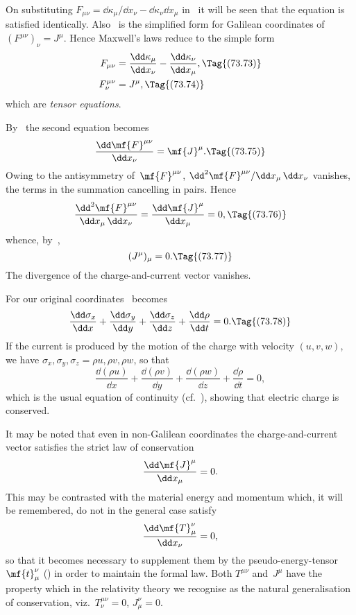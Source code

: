\documentclass[12pt]{book}
\begin{document}
On substituting $F_{\mu\nu} = \dd\kappa_{\mu}/\dd x_{\nu} - \dd\kappa_{\nu}\dd x_{\mu}$ in~ it will be seen that the
equation is satisfied identically. Also ~is the simplified form for Galilean
coordinates of $(F^{\mu\nu})_{\nu} = J^{\mu}$. Hence Maxwell's laws reduce to the simple form
\begin{align*}
  F_{\mu\nu} &= \frac{\dd\kappa_{\mu}}{\dd x_{\nu}} - \frac{\dd\kappa_{\nu}}{\dd x_{\mu}},
  \Tag{(73.73)} \\
  F_{\nu}^{\mu\nu} &= J^{\mu},
  \Tag{(73.74)}
  \end{align*}
which are \emph{tensor equations}.

By~ the second equation becomes
\[
\frac{\dd\mf{F}^{\mu\nu}}{\dd x_{\nu}} = \mf{J}^{\mu}.
\Tag{(73.75)}
\]
Owing to the antisymmetry of~$\mf{F}^{\mu\nu}$, $\dd^{2}\mf{F}^{\mu\nu}/\dd x_{\mu}\, \dd x_{\nu}$ vanishes, the terms in the
summation cancelling in pairs. Hence
\[
\frac{\dd^{2}\mf{F}^{\mu\nu}}{\dd x_{\mu}\, \dd x_{\nu}}
= \frac{\dd\mf{J}^{\mu}}{\dd x_{\mu}} = 0,
\Tag{(73.76)}
\]
whence, by~,
\[
(J^{\mu})_{\mu} = 0.
\Tag{(73.77)}
\]
The divergence of the charge-and-current vector vanishes.
%
%

For our original coordinates ~becomes
\[
\frac{\dd\sigma_{x}}{\dd x}
+ \frac{\dd\sigma_{y}}{\dd y}
+ \frac{\dd\sigma_{z}}{\dd z}
+ \frac{\dd\rho}{\dd t} = 0.
\Tag{(73.78)}
\]
If the current is produced by the motion of the charge with velocity $(u, v, w)$,
we have $\sigma_{x}, \sigma_{y}, \sigma_{z} = \rho u, \rho v, \rho w$, so that
\[
\frac{\dd(\rho u)}{\dd x}
+ \frac{\dd(\rho v)}{\dd y}
+ \frac{\dd(\rho w)}{\dd z}
+ \frac{\dd\rho}{\dd t} = 0,
\]
which is the usual equation of continuity (cf.~), showing that electric
%
charge is conserved.

It may be noted that even in non-Galilean coordinates the charge-and-current
vector satisfies the strict law of conservation
%
\[
\frac{\dd\mf{J}^{\mu}}{\dd x_{\mu}} = 0.
\]
This may be contrasted with the material energy and momentum which, it will
be remembered, do not in the general case satisfy
\[
\frac{\dd\mf{T}_{\mu}^{\nu}}{\dd x_{\nu}} = 0,
\]
so that it becomes necessary to supplement them by the pseudo-energy-tensor~$\mf{t}_{\mu}^{\nu}$
() in order to maintain the formal law. Both $T^{\mu\nu}$ and~$J^{\mu}$ have the
property which in the relativity theory we recognise as the natural generalisation
of conservation, viz.\ $T_{\nu}^{\mu\nu} = 0$, $J_{\mu}^{\nu} = 0$.
\end{document}
